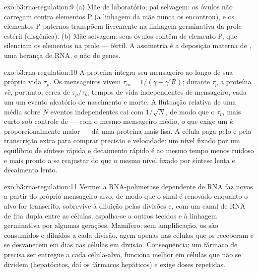\begin{solution}{exo:b3:rna-regulation:9}
(a) Mãe de laboratório, pai selvagem: os óvulos não carregam 
contra elementos P (a linhagem da mãe nunca os encontrou), e os
elementos P paternos transpõem livremente na linhagem germinativa da
prole --- estéril (disgênica). (b) Mãe selvagem: seus óvulos contêm
 de elemento P, que silenciam os elementos na prole --- fértil. A
assimetria é a deposição materna de , uma herança de RNA, e não
de genes.
\end{solution}

\begin{solution}{exo:b3:rna-regulation:10}
A proteína integra seu mensageiro ao longo de sua própria vida
$\tau_{p}$. Os mensageiros vivem $\tau_{m} = 1/(\gamma + \gamma' R)$;
durante $\tau_{p}$ a proteína vê, portanto, cerca de
$\tau_{p}/\tau_{m}$ tempos de vida independentes de mensageiro, cada um
um evento aleatório de nascimento e morte. A flutuação relativa de uma
média sobre $N$ eventos independentes cai com $1/\sqrt{N}$, de modo que
o $\tau_{m}$ mais curto sob controle de  --- com o mesmo
mensageiro médio, o que exige um $k$ proporcionalmente maior --- dá uma
proteína mais lisa. A célula paga pelo  e pela transcrição
extra para comprar precisão e velocidade: um nível fixado por um
equilíbrio de síntese rápida e decaimento rápido é ao mesmo tempo menos
ruidoso e mais pronto a se reajustar do que o mesmo nível fixado por
síntese lenta e decaimento lento.
\end{solution}

\begin{solution}{exo:b3:rna-regulation:11}
Verme: a RNA-polimerase dependente de RNA faz novos  a partir do
próprio mensageiro-alvo, de modo que o sinal é renovado enquanto o alvo
for transcrito, sobrevive à diluição pelas divisões e, com um canal de
RNA de fita dupla entre as células, espalha-se a outros tecidos e à
linhagem germinativa por algumas gerações. Mamífero: sem amplificação,
os  são consumidos e diluídos a cada divisão, agem apenas nas
células que os receberam e se desvanecem em dias nas células em
divisão. Consequência: um fármaco de  precisa ser entregue a cada
célula-alvo, funciona melhor em células que não se dividem
(hepatócitos, daí os fármacos hepáticos) e exige doses repetidas.
\end{solution}

